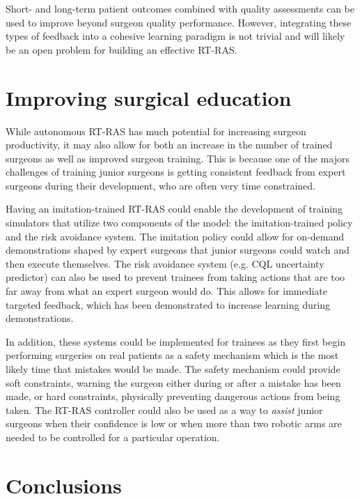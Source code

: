 \documentclass[fleqn,10pt]{wlscirep}\twocolumn
\begin{document}
Short- and long-term patient outcomes combined with quality assessments can be used to improve beyond surgeon quality performance. However, integrating these types of feedback into a cohesive learning paradigm is not trivial and will likely be an open problem for building an effective RT-RAS.



\section*{Improving surgical education}

While autonomous RT-RAS has much potential for increasing surgeon productivity, it may also allow for both an increase in the number of trained surgeons as well as improved surgeon training. This is because one of the majors challenges of training junior surgeons is getting consistent feedback from expert surgeons during their development, who are often very time constrained. 

Having an imitation-trained RT-RAS could enable the development of training simulators that utilize two components of the model: the imitation-trained policy and the risk avoidance system. The imitation policy could allow for on-demand demonstrations shaped by expert surgeons that junior surgeons could watch and then execute themselves. The risk avoidance system (e.g. CQL uncertainty predictor) can also be used to prevent trainees from taking actions that are too far away from what an expert surgeon would do. This allows for immediate targeted feedback, which has been demonstrated to increase learning during demonstrations\cite{haque2022assessment}. 

In addition, these systems could be implemented for trainees as they first begin performing surgeries on real patients as a safety mechanism which is the most likely time that mistakes would be made\cite{moon2022early}.
The safety mechanism could provide soft constraints, warning the surgeon either during or after a mistake has been made, or hard constraints, physically preventing dangerous actions from being taken.
The RT-RAS controller could also be used as a way to \textit{assist} junior surgeons when their confidence is low or when more than two robotic arms are needed to be controlled for a particular operation.

\section*{Conclusions}
\end{document}
